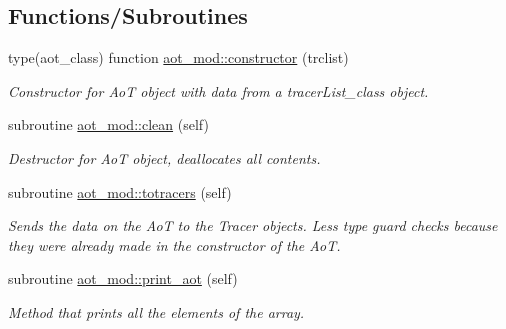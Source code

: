\subsection*{Functions/\+Subroutines}
\begin{DoxyCompactItemize}
\item 
type(aot\+\_\+class) function \mbox{\hyperlink{namespaceaot__mod_a74ce07a020a7470208360766cfdb12df}{aot\+\_\+mod\+::constructor}} (trclist)
\begin{DoxyCompactList}\small\item\em Constructor for AoT object with data from a tracer\+List\+\_\+class object. \end{DoxyCompactList}\item 
subroutine \mbox{\hyperlink{namespaceaot__mod_a054fca942c27758a0ad6afaa68a3a08e}{aot\+\_\+mod\+::clean}} (self)
\begin{DoxyCompactList}\small\item\em Destructor for AoT object, deallocates all contents. \end{DoxyCompactList}\item 
subroutine \mbox{\hyperlink{namespaceaot__mod_a73ecd8babd54975720741493be733c48}{aot\+\_\+mod\+::totracers}} (self)
\begin{DoxyCompactList}\small\item\em Sends the data on the AoT to the Tracer objects. Less type guard checks because they were already made in the constructor of the AoT. \end{DoxyCompactList}\item 
subroutine \mbox{\hyperlink{namespaceaot__mod_aa6ef0ed7c67e66bf04e7aa0070bbde7f}{aot\+\_\+mod\+::print\+\_\+aot}} (self)
\begin{DoxyCompactList}\small\item\em Method that prints all the elements of the array. \end{DoxyCompactList}\end{DoxyCompactItemize}
